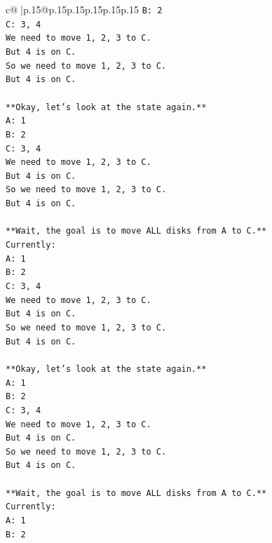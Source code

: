 \documentclass{article}
\begin{document}
{\begin{supertabular}{c@{$\;$}|p{.15\linewidth}@{}p{.15\linewidth}p{.15\linewidth}p{.15\linewidth}p{.15\linewidth}p{.15\linewidth}}
{{{\texttt{B: 2} \\
\texttt{C: 3, 4} \\
\texttt{We need to move 1, 2, 3 to C.} \\
\texttt{But 4 is on C.} \\
\texttt{So we need to move 1, 2, 3 to C.} \\
\texttt{But 4 is on C.} \\
\\ 
\texttt{**Okay, let's look at the state again.**} \\
\texttt{A: 1} \\
\texttt{B: 2} \\
\texttt{C: 3, 4} \\
\texttt{We need to move 1, 2, 3 to C.} \\
\texttt{But 4 is on C.} \\
\texttt{So we need to move 1, 2, 3 to C.} \\
\texttt{But 4 is on C.} \\
\\ 
\texttt{**Wait, the goal is to move ALL disks from A to C.**} \\
\texttt{Currently:} \\
\texttt{A: 1} \\
\texttt{B: 2} \\
\texttt{C: 3, 4} \\
\texttt{We need to move 1, 2, 3 to C.} \\
\texttt{But 4 is on C.} \\
\texttt{So we need to move 1, 2, 3 to C.} \\
\texttt{But 4 is on C.} \\
\\ 
\texttt{**Okay, let's look at the state again.**} \\
\texttt{A: 1} \\
\texttt{B: 2} \\
\texttt{C: 3, 4} \\
\texttt{We need to move 1, 2, 3 to C.} \\
\texttt{But 4 is on C.} \\
\texttt{So we need to move 1, 2, 3 to C.} \\
\texttt{But 4 is on C.} \\
\\ 
\texttt{**Wait, the goal is to move ALL disks from A to C.**} \\
\texttt{Currently:} \\
\texttt{A: 1} \\
\texttt{B: 2} \\
}}}
\end{supertabular}}
\end{document}
